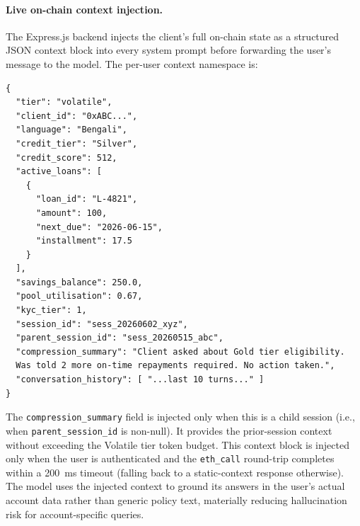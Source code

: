 \documentclass[12pt,a4paper]{report}
\begin{document}
\paragraph{Live on-chain context injection.}
The Express.js backend injects the client's full on-chain state as a structured JSON context block into every system prompt before forwarding the user's message to the model. The per-user context namespace is:
\begin{verbatim}
{
  "tier": "volatile",
  "client_id": "0xABC...",
  "language": "Bengali",
  "credit_tier": "Silver",
  "credit_score": 512,
  "active_loans": [
    {
      "loan_id": "L-4821",
      "amount": 100,
      "next_due": "2026-06-15",
      "installment": 17.5
    }
  ],
  "savings_balance": 250.0,
  "pool_utilisation": 0.67,
  "kyc_tier": 1,
  "session_id": "sess_20260602_xyz",
  "parent_session_id": "sess_20260515_abc",
  "compression_summary": "Client asked about Gold tier eligibility.
  Was told 2 more on-time repayments required. No action taken.",
  "conversation_history": [ "...last 10 turns..." ]
}
\end{verbatim}
The \texttt{compression\_summary} field is injected only when this is a child session (i.e., when \texttt{parent\_session\_id} is non-null). It provides the prior-session context without exceeding the Volatile tier token budget. This context block is injected only when the user is authenticated and the \texttt{eth\_call} round-trip completes within a 200~ms timeout (falling back to a static-context response otherwise). The model uses the injected context to ground its answers in the user's actual account data rather than generic policy text, materially reducing hallucination risk for account-specific queries.
\end{document}
